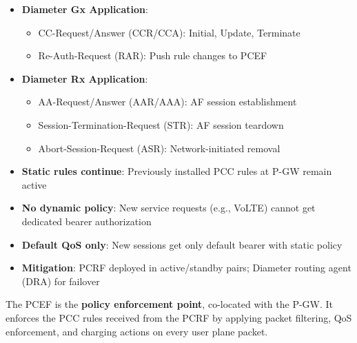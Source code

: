 
\begin{itemize}
\tightlist
\item
  \textbf{Diameter Gx Application}:

  \begin{itemize}
  \tightlist
  \item
    CC-Request/\allowbreak{}Answer (CCR/\allowbreak{}CCA): Initial, Update, Terminate
  \item
    Re-Auth-Request (RAR): Push rule changes to PCEF
  \end{itemize}
\item
  \textbf{Diameter Rx Application}:

  \begin{itemize}
  \tightlist
  \item
    AA-Request/\allowbreak{}Answer (AAR/\allowbreak{}AAA): AF session establishment
  \item
    Session-Termination-Request (STR): AF session teardown
  \item
    Abort-Session-Request (ASR): Network-initiated removal
  \end{itemize}
\end{itemize}


\begin{itemize}
\tightlist
\item
  \textbf{Static rules continue}: Previously installed PCC rules at P-GW remain active
\item
  \textbf{No dynamic policy}: New service requests (e.g., VoLTE) cannot get dedicated bearer authorization
\item
  \textbf{Default QoS only}: New sessions get only default bearer with static policy
\item
  \textbf{Mitigation}: PCRF deployed in active/\allowbreak{}standby pairs; Diameter routing agent (DRA) for failover
\end{itemize}



\CNchained{}

The PCEF is the \textbf{policy enforcement point}, co-located with the P-GW. It enforces the PCC rules received from the PCRF by applying packet filtering, QoS enforcement, and charging actions on every user plane packet.

